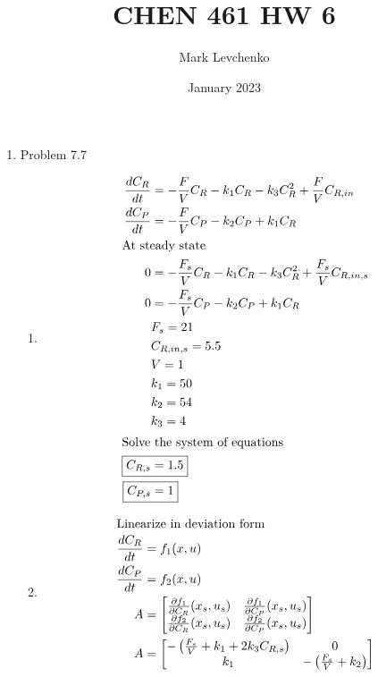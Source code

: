 \documentclass[12pt]{article}
\title{CHEN 461 HW 6}
\author{Mark Levchenko}
\date{January 2023}
\begin{document}
\begin{enumerate}

\newpage
\item Problem 7.7
\begin{enumerate}
    \item 
    \begin{align*}
        \frac{dC_R}{dt} &= -\frac{F}{V} C_R - k_1 C_R - k_3 C_R^2 + \frac{F}{V} C_{R,in} \\
        \frac{dC_P}{dt} &= -\frac{F}{V} C_P - k_2 C_P + k_1 C_R \\
        \intertext{At steady state}
        0 &= -\frac{F_s}{V} C_R - k_1 C_R - k_3 C_R^2 + \frac{F_s}{V} C_{R,in,s} \\
        0 &= -\frac{F_s}{V} C_P - k_2 C_P + k_1 C_R \\
        & F_s = 21 \\
        & C_{R,in,s} = 5.5 \\
        & V = 1 \\
        & k_1 = 50 \\
        & k_2 = 54 \\
        & k_3 = 4 \\
        \intertext{Solve the system of equations}
        \Aboxed{C_{R,s} &= 1.5} \\
        \Aboxed{C_{P,s} &= 1}
    \end{align*}
    \item 
    \begin{align*}
        \intertext{Linearize in deviation form}
        \frac{dC_R}{dt} &= f_1(x, u) \\
        \frac{dC_P}{dt} &= f_2(x, u) \\
        A &= \begin{bmatrix}
            \frac{\partial f_1}{\partial C_R}(x_s, u_s) & \frac{\partial f_1}{\partial C_P}(x_s, u_s) \\
            \frac{\partial f_2}{\partial C_R}(x_s, u_s) & \frac{\partial f_2}{\partial C_P}(x_s, u_s) \\
        \end{bmatrix} \\
        A &= \begin{bmatrix}
            -\left(\frac{F_s}{V} + k_1 + 2 k_3 C_{R,s}\right) & 0 \\
            k_1 & -\left(\frac{F_s}{V} + k_2\right) \\
        \end{bmatrix} \\

\end{align*}
\end{enumerate}
\end{enumerate}
\end{document}
